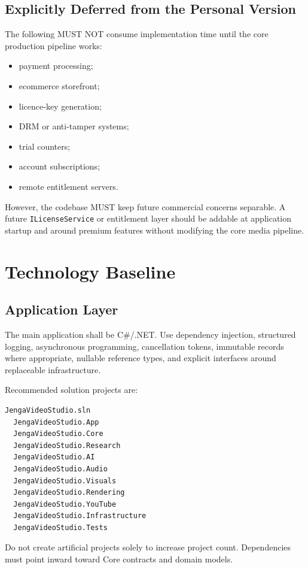 \documentclass[10pt,journal,compsoc]{IEEEtran}
\begin{document}
\subsection{Explicitly Deferred from the Personal Version}

The following MUST NOT consume implementation time until the core production pipeline works:
\begin{itemize}
    \item payment processing;
    \item ecommerce storefront;
    \item licence-key generation;
    \item DRM or anti-tamper systems;
    \item trial counters;
    \item account subscriptions;
    \item remote entitlement servers.
\end{itemize}

However, the codebase MUST keep future commercial concerns separable. A future \texttt{ILicenseService} or entitlement layer should be addable at application startup and around premium features without modifying the core media pipeline.

\section{Technology Baseline}

\subsection{Application Layer}

The main application shall be C\#/.NET. Use dependency injection, structured logging, asynchronous programming, cancellation tokens, immutable records where appropriate, nullable reference types, and explicit interfaces around replaceable infrastructure.

Recommended solution projects are:
\begin{verbatim}
JengaVideoStudio.sln
  JengaVideoStudio.App
  JengaVideoStudio.Core
  JengaVideoStudio.Research
  JengaVideoStudio.AI
  JengaVideoStudio.Audio
  JengaVideoStudio.Visuals
  JengaVideoStudio.Rendering
  JengaVideoStudio.YouTube
  JengaVideoStudio.Infrastructure
  JengaVideoStudio.Tests
\end{verbatim}

Do not create artificial projects solely to increase project count. Dependencies must point inward toward Core contracts and domain models.
\end{document}
